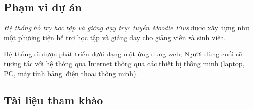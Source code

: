 \documentclass[./../main.tex]{subfiles}
\begin{document}
\subsection{Phạm vi dự án}
\textit{Hệ thống hỗ trợ học tập và giảng dạy trực tuyến Moodle Plus} được xây dựng như một phương tiện hỗ trợ học tập và giảng dạy cho giảng viên và sinh viên.

Hệ thống sẽ được phát triển dưới dạng một ứng dụng web, Người dùng cuối sẽ tương tác với hệ thống qua Internet thông qua các thiết bị thông minh (laptop, PC, máy tính bảng, điện thoại thông minh).

\subsection{Tài liệu tham khảo}
\nocite{*}
\printbibliography
\end{document}
